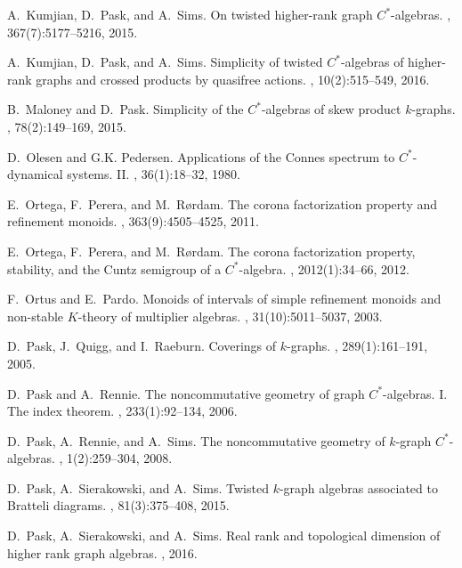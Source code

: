 \documentclass[a4paper, 12pt]{amsart}
\numberwithin{equation}{section}
\newcounter{theorem}
\theoremstyle{remark}
\theoremstyle{definition}
\begin{document}
\begin{thebibliography}{10}
 A.~Kumjian, D.~Pask, and A.~Sims.
\newblock On twisted higher-rank graph {$C^*$}-algebras.
, 367(7):5177--5216, 2015.

 A.~Kumjian, D.~Pask, and A.~Sims.
\newblock Simplicity of twisted {$C^*$}-algebras of higher-rank graphs and
  crossed products by quasifree actions.
, 10(2):515--549, 2016.

 B.~Maloney and D.~Pask.
\newblock Simplicity of the {$C^*$}-algebras of skew product {$k$}-graphs.
, 78(2):149--169, 2015.

 D.~Olesen and G.K. Pedersen.
\newblock Applications of the {C}onnes spectrum to {$C^*$}-dynamical systems.
  {II}.
, 36(1):18--32, 1980.

 E.~Ortega, F.~Perera, and M.~R{\o}rdam.
\newblock The corona factorization property and refinement monoids.
, 363(9):4505--4525, 2011.

 E.~Ortega, F.~Perera, and M.~R{\o}rdam.
\newblock The corona factorization property, stability, and the {C}untz
  semigroup of a {$C^*$}-algebra.
, 2012(1):34--66, 2012.

 F.~Ortus and E.~Pardo.
\newblock Monoids of intervals of simple refinement monoids and non-stable
  {$K$}-theory of multiplier algebras.
, 31(10):5011--5037, 2003.

 D.~Pask, J.~Quigg, and I.~Raeburn.
\newblock Coverings of {$k$}-graphs.
, 289(1):161--191, 2005.

 D.~Pask and A.~Rennie.
\newblock The noncommutative geometry of graph {$C^*$}-algebras. {I}. {T}he
  index theorem.
, 233(1):92--134, 2006.

 D.~Pask, A.~Rennie, and A.~Sims.
\newblock The noncommutative geometry of {$k$}-graph {$C^*$}-algebras.
, 1(2):259--304, 2008.

 D.~Pask, A.~Sierakowski, and A.~Sims.
\newblock Twisted {$k$}-graph algebras associated to {B}ratteli diagrams.
, 81(3):375--408, 2015.

 D.~Pask, A.~Sierakowski, and A.~Sims.
\newblock Real rank and topological dimension of higher rank graph algebras.
, 2016.


\end{thebibliography}
\end{document}
